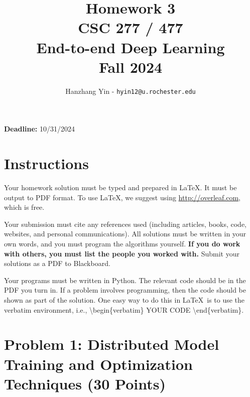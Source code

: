 \documentclass[11pt, oneside]{article}   	%
\title{Homework 3 \\ CSC 277 / 477 \\ End-to-end Deep Learning \\ Fall 2024}
\author{Hanzhang Yin - \texttt{hyin12@u.rochester.edu}}
\date{}
\begin{document}
\maketitle


\begin{center}
    \textbf{Deadline:} 10/31/2024
\end{center}


\section*{Instructions}

Your homework solution must be typed and prepared in \LaTeX. It must be output to PDF format. To use \LaTeX, we suggest using \url{http://overleaf.com}, which is free.

Your submission must cite any references used (including articles, books, code, websites, and personal communications).  All solutions must be written in your own words, and you must program the algorithms yourself. \textbf{If you do work with others, you must list the people you worked with.} Submit your solutions as a PDF to Blackboard. 


Your programs must be written in Python. The relevant code should be in the PDF you turn in. If a problem involves programming, then the code should be shown as part of the solution. One easy way to do this in \LaTeX \, is to use the verbatim environment, i.e., \textbackslash begin\{verbatim\} YOUR CODE \textbackslash end\{verbatim\}.








\clearpage

\section*{Problem 1: Distributed Model Training and Optimization Techniques (30 Points)}
\end{document}
